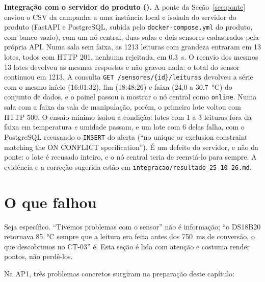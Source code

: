 \textbf{Integração com o servidor do produto ().} A ponte da
Seção~\ref{sec:ponte} enviou o CSV da campanha a uma instância local e
isolada do servidor do produto (FastAPI e PostgreSQL, subida pelo
\texttt{docker-compose.yml} do produto, com banco vazio), com um nó
central, duas salas e dois sensores cadastrados pela própria API. Numa
sala sem faixa, as \num{1213} leituras com grandeza entraram em 13 lotes,
todos com HTTP 201, nenhuma rejeitada, em \SI{0,3}{\second}. O reenvio
dos mesmos 13 lotes devolveu as mesmas respostas e não gravou nada: o
total do sensor continuou em \num{1213}. A consulta
\texttt{GET /sensores/\{id\}/leituras} devolveu a série com o mesmo início
(16:01:32), fim (18:48:26) e faixa (24,0 a \SI{30,7}{\celsius}) do
conjunto de dados, e o painel passou a mostrar o nó central como
\texttt{online}. Numa sala com a faixa da sala de manipulação, porém, o
primeiro lote voltou com HTTP 500. O ensaio mínimo isolou a condição:
lotes com 1 a 3 leituras fora da faixa em temperatura \emph{e} umidade
passam, e um lote com 6 delas falha, com o PostgreSQL recusando o
\texttt{INSERT} do alerta (\enquote{no unique or exclusion constraint
matching the ON CONFLICT specification}). É um defeito do servidor, e não
da ponte: o lote é recusado inteiro, e o nó central teria de reenviá-lo
para sempre. A evidência e a correção sugerida estão em
\texttt{integracao/resultado\_25-10-26.md}.

\section{O que falhou}
\label{sec:oquefalhou}

\begin{orientacao}
Seja específico. \enquote{Tivemos problemas com o sensor} não é
informação; \enquote{o DS18B20 retornava \SI{85}{\celsius} sempre que a
leitura era feita antes dos \SI{750}{\milli\second} de conversão, o que
descobrimos no CT-03} é. Esta seção é lida com atenção e costuma render
pontos, não perdê-los.
\end{orientacao}

Na AP1, três problemas concretos surgiram na preparação deste capítulo:

